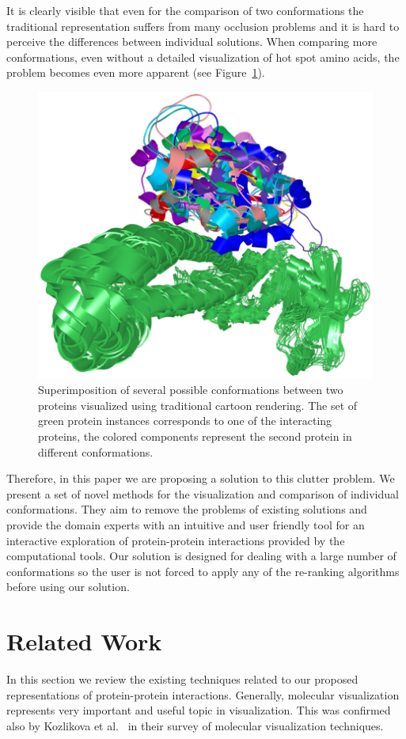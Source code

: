 \documentclass[journal]{vgtc}                %
\begin{document}
It is clearly visible that even for the comparison of two conformations the traditional representation suffers from many occlusion problems and it is hard to perceive the differences between individual solutions.
When comparing more conformations, even without a detailed visualization of hot spot amino acids, the problem becomes even more apparent (see Figure~\ref{fig:problem}).

\begin{figure}[tb]
  \centering
  \includegraphics[width=0.7\columnwidth]{problem.png}
  \caption{Superimposition of several possible conformations between two proteins visualized using traditional cartoon rendering. The set of green protein instances corresponds to one of the interacting proteins, the colored components represent the second protein in different conformations.}
  \label{fig:problem}
\end{figure}

Therefore, in this paper we are proposing a solution to this clutter problem.
We present a set of novel methods for the visualization and comparison of individual conformations.
They aim to remove the problems of existing solutions and provide the domain experts with an intuitive and user friendly tool for an interactive exploration of protein-protein interactions provided by the computational tools.
Our solution is designed for dealing with a large number of conformations so the user is not forced to apply any of the re-ranking algorithms before using our solution. 


\section{Related Work}
In this section we review the existing techniques related to our proposed representations of protein-protein interactions.
Generally, molecular visualization represents very important and useful topic in visualization.
This was confirmed also by Kozlikova et al.~\cite{Kozlikova2015} in their survey of molecular visualization techniques.
\end{document}
